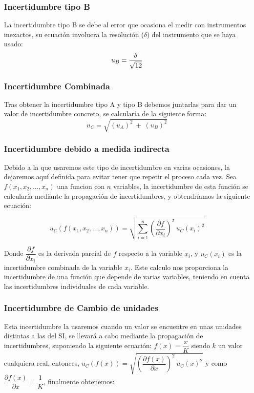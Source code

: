 \documentclass[10pt,onecolumn]{article}
\begin{document}
\subsubsection{Incertidumbre tipo B}
La incertidumbre tipo B se debe al error que ocasiona el medir con instrumentos inexactos, su ecuación involucra la resolución ($\delta$) del instrumento que se haya usado:
\begin{equation}\centering
    u_B = \dfrac{\delta}{\sqrt{12}}
\end{equation}

\subsubsection{Incertidumbre Combinada}
Tras obtener la incertidumbre tipo A y tipo B debemos juntarlas para dar un valor de incertidumbre concreto, se calcularía de la siguiente forma:
\begin{equation}
    u_C = \sqrt{(u_A)^2\ +\ (u_B)^2}
\end{equation}

\subsubsection{Incertidumbre debido a medida indirecta}
Debido a la que usaremos este tipo de incertidumbre en varias ocasiones, la dejaremos aquí definida para evitar 
tener que repetir el proceso cada vez. Sea $f(x_1,x_2,\ldots,x_n)$ una funcion con $n$ variables, la incertidumbre
de esta función se calcularía mediante la propagación de incertidumbres, y obtendríamos la siguiente ecuación:

\begin{equation}
    \boxed{u_C(f(x_1,x_2,\ldots,x_n)) = \sqrt{\sum_{i=1}^{n} \left(\dfrac{\partial f}{\partial x_i}\right)^2\ u_C(x_i)^2}}
\end{equation}

Donde $\dfrac{\partial f}{\partial x_i}$ es la derivada parcial de $f$ respecto a la variable $x_i$, y $u_C(x_i)$ es la incertidumbre combinada de la variable $x_i$.
Este calculo nos proporciona la incertidumbre de una función que depende de varias variables, teniendo en cuenta las incertidumbres individuales de cada variable.
\subsubsection{Incertidumbre de Cambio de unidades}
Esta incertidumbre la usaremos cuando un valor se encuentre en unas unidades distintas a las del SI, 
se llevará a cabo mediante la propagación de incertidumbres, suponiendo  la siguiente ecuación: 
$f(x) = \dfrac{x}{K}$ siendo $k$ un valor cualquiera real, entonces, $u_C(f(x)) = \sqrt{(\dfrac{\partial f(x)}{\partial x})^2\ u_C(x)^2}$ 
y como $\dfrac{\partial f(x)}{\partial x} = \dfrac{1}{K}$, finalmente obtenemos:
\end{document}
